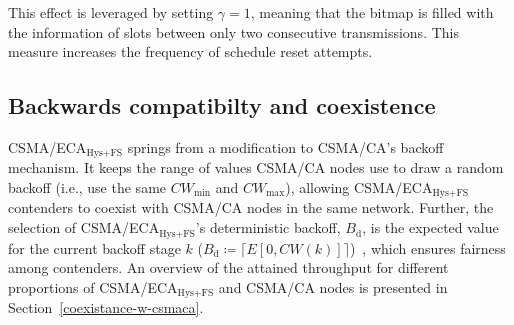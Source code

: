 		This effect is leveraged by setting $\gamma=1$, meaning that the bitmap is filled with the information of slots between only two consecutive transmissions. This measure increases the frequency of schedule reset attempts.
	
	\subsection{Backwards compatibilty and coexistence}
	CSMA/ECA$_{\text{Hys+FS}}$ springs from a modification to CSMA/CA's backoff mechanism. It keeps the range of values CSMA/CA nodes use to draw a random backoff (i.e., use the same $CW_{\min}$ and $CW_{\max}$), allowing CSMA/ECA$_{\text{Hys+FS}}$ contenders to coexist with CSMA/CA nodes in the same network. Further, the selection of CSMA/ECA$_{\text{Hys+FS}}$'s deterministic backoff, $B_{\text{d}}$, is the expected value for the current backoff stage $k$ ($B_{\text{d}}\coloneqq\lceil{E[0,CW(k)]}\rceil$)~\cite{research2standards}, which ensures fairness among contenders. An overview of the attained throughput for different proportions of CSMA/ECA$_{\text{Hys+FS}}$ and CSMA/CA nodes is presented in Section~\ref{coexistance-w-csmaca}.
	
	